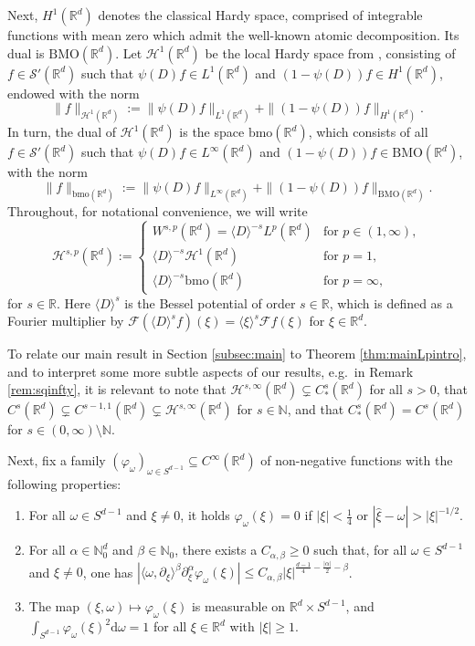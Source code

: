 \documentclass{amsart}
\numberwithin{equation}{section}
\theoremstyle{definition}
\newcommand{\R}{\mathbb{R}}
\newcommand{\Rd}{\mathbb{R}^{d}}
\newcommand{\Rn}{\mathbb{R}^{d}}
\newcommand{\N}{\mathbb{N}}
\newcommand {\bmo}{\mathrm{bmo}}
\newcommand {\BMO}{{\mathrm{BMO}}}
\newcommand{\F}{\mathcal{F}}
\newcommand {\HT}{\mathcal{H}}
\newcommand {\ud}{\mathrm{d}}
\newcommand {\ph}{\varphi}
\newcommand {\w}{\omega}
\newcommand {\rb}{\rangle}
\newcommand {\lb}{\langle}
\begin{document}
Next, $H^1(\R^d)$ denotes the classical Hardy space, comprised of integrable functions with mean zero which admit the well-known atomic decomposition. Its dual is $\BMO(\Rd)$. Let $\mathcal{H}^1(\R^d)$ be the local Hardy space from \cite{Goldberg1979}, consisting of $f \in \mathcal{S}'(\R^d)$ such that $\psi(D)f \in L^1(\R^d)$ and $(1-\psi(D))f \in H^1(\R^d)$, endowed with the norm
\begin{equation*}
    \| f \|_{\mathcal{H}^1(\R^d)} := \|\psi(D) f \|_{L^1(\R^d)} + \|(1-\psi(D))f \|_{H^1(\R^d)}.
\end{equation*}
In turn, the dual of $\HT^{1}(\Rn)$ is the space $\bmo(\Rd)$, which consists of all $f \in \mathcal{S}'(\R^d)$ such that $\psi(D)f \in L^{\infty}(\R^d)$ and $(1-\psi(D))f \in \BMO(\R^d)$, with the norm
\begin{equation*}
    \| f \|_{\bmo(\R^d)} := \| \psi(D)f \|_{L^\infty(\R^d)} + \| (1-\psi(D))f \|_{\BMO(\R^d)}.
\end{equation*}
Throughout, for notational convenience, we will write \begin{equation}\label{eq:localHardy}
\HT^{s,p}(\Rn):=
\begin{cases}
W^{s,p}(\Rn)=\lb D\rb^{-s}L^{p}(\Rn)&\text{for }p\in(1,\infty),\\
\lb D\rb^{-s}\HT^{1}(\Rn)&\text{for }p=1,\\
\lb D\rb^{-s}\bmo(\Rn)&\text{for }p=\infty,
\end{cases}
\end{equation}
for $s\in\R$. Here $\langle D \rangle^s$ is the Bessel potential of order $s\in\R$, which is defined as a Fourier multiplier by $\F(\langle D \rangle^s f)(\xi) = \langle \xi \rangle^s \F f (\xi)$ for $\xi\in\Rd$.

To relate our main result in Section \ref{subsec:main} to Theorem \ref{thm:mainLpintro}, and to interpret some more subtle aspects of our results, e.g.~in Remark \ref{rem:sqinfty}, it is relevant to note that $\HT^{s,\infty}(\Rd)\subsetneq C^{s}_{*}(\Rd)$ for all $s>0$, that $C^{s}(\Rd)\subsetneq C^{s-1,1}(\Rd)\subsetneq \HT^{s,\infty}(\Rd)$ for $s\in\N$, and that $C^{s}_{*}(\Rd)=C^{s}(\Rd)$ for $s\in (0,\infty)\setminus \N$.

Next, fix a family $(\ph_{\w})_{\w\in S^{d-1}}\subseteq C^{\infty}(\Rn)$ of non-negative functions with the following properties:
\begin{enumerate}
\item\label{it:phiproperties1} For all $\w\in S^{d-1}$ and $\xi\neq0$, it holds $\ph_{\w}(\xi)=0$ if $|\xi|<\frac{1}{4}$ or $|\hat{\xi}-\w|>|\xi|^{-1/2}$.
\item\label{it:phiproperties2} For all $\alpha\in\N_{0}^{d}$ and $\beta\in\N_{0}$, there exists a $C_{\alpha,\beta}\geq0$ such that, for all $\w\in S^{d-1}$ and $\xi\neq0$, one has  
$|\lb \w,\partial_{\xi}\rb^{\beta}\partial^{\alpha}_{\xi}\ph_{\w}(\xi)|\leq C_{\alpha,\beta}|\xi|^{\frac{d-1}{4}-\frac{|\alpha|}{2}-\beta}$.
\item\label{it:phiproperties3}
The map $(\xi,\w)\mapsto \ph_{\w}(\xi)$ is measurable on $\Rn\times S^{d-1}$, and $\int_{S^{d-1}}\ph_{\w}(\xi)^{2}\ud\w=1$ for all $\xi\in\Rn$ with $|\xi|\geq 1$.
\end{enumerate}
\end{document}
